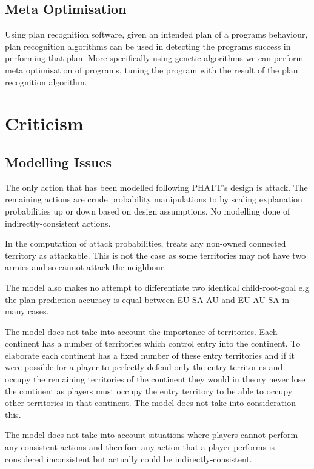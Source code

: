 \documentclass[parskip]{cs4rep}
\begin{document}
\subsection{Meta Optimisation}

Using plan recognition software, given an intended plan of a programs behaviour, plan recognition algorithms can be used in detecting the programs success in performing that plan. More specifically using genetic algorithms we can perform meta optimisation of programs, tuning the program with the result of the plan recognition algorithm.

\section{Criticism}

\subsection{Modelling Issues}

The only action that has been modelled following PHATT's design is attack. The remaining actions are crude probability manipulations to by scaling explanation probabilities up or down based on design assumptions. No modelling done of indirectly-consistent actions.

In the computation of attack probabilities, treats any non-owned connected territory as attackable. This is not the case as some territories may not have two armies and so cannot attack the neighbour.

The model also makes no attempt to differentiate two identical child-root-goal  e.g the plan prediction accuracy is equal between EU SA AU and EU AU SA in many cases. 

The model does not take into account the importance of territories. Each continent has a number of territories which control entry into the continent. To elaborate each continent has a fixed number of these entry territories and if it were possible for a player to perfectly defend only the entry territories and occupy the remaining territories of the continent they would in theory never lose the continent as players must occupy the entry territory to be able to occupy other territories in that continent. The model does not take into consideration this.

The model does not take into account situations where players cannot perform any consistent actions and therefore any action that a player performs is considered inconsistent but actually could be indirectly-consistent.
\end{document}
